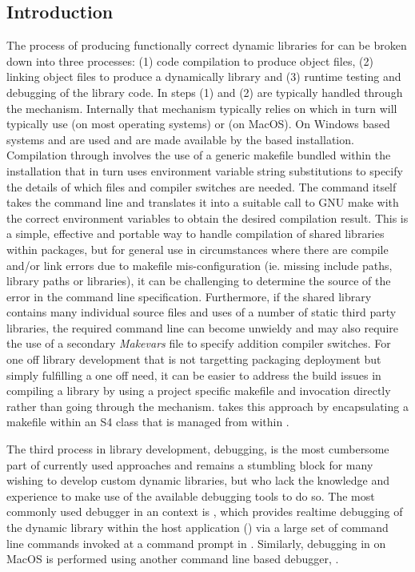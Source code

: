 \hypertarget{introduction}{%
\subsection{Introduction}\label{introduction}}
The process of producing functionally correct dynamic libraries for  can be broken down into three processes: (1) code compilation to produce object files,
(2) linking object files to produce a dynamically library and (3) runtime testing and debugging of the library code. In  steps (1) and (2) 
are typically handled through the \citep{SHLIB} mechanism. Internally that mechanism typically relies on \citep{GnuMake} which 
in turn will typically use \citep{gcc} (on most operating systems) or \citep{LLVM} (on MacOS). On Windows based systems  and 
are used and are made available by the  based  installation\citep{UsingRtools}. Compilation through  
involves the use of a generic makefile bundled within the  installation that in turn uses environment variable string substitutions to specify the details 
of which files and compiler switches are needed. The command itself takes the command line and translates it into a suitable call to GNU make with the correct 
environment variables to obtain the desired compilation result. This is a simple, effective and portable way to handle compilation of shared 
libraries within  packages, but for general use in circumstances where there are compile and/or link errors due to makefile mis-configuration 
(ie. missing include paths, library paths or libraries), it can be challenging to determine the source of the error in the command line specification. Furthermore, 
if the shared library contains many individual source files and uses of a number of static third party libraries, the required command line can become 
unwieldy and may also require the use of a secondary \emph{Makevars} file to specify addition compiler switches. For one off library development that is not targetting
packaging deployment but simply fulfilling a one off need, it can be easier to address the build issues in compiling a library by using a project specific makefile 
and  invocation directly rather than going through the  mechanism.  takes this approach by encapsulating a makefile within 
an S4 class that is managed from within . 

The third process in library development, debugging, is the most cumbersome part of currently used approaches and remains a stumbling 
block for many wishing to develop custom dynamic libraries, but who lack the knowledge and experience to make use of the available debugging 
tools to do so. The most commonly used debugger in an  context is \citep{GDB}, which provides realtime debugging of the dynamic library within the
host application () via a large set of command line commands invoked at a command prompt in . Similarly, debugging in  on MacOS is performed using another 
command line based debugger, \citep{LLDB}. 

